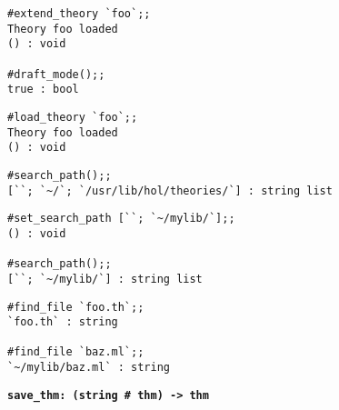 \vskip4mm
\begin{session}\begin{verbatim}
#extend_theory `foo`;;
Theory foo loaded
() : void

#draft_mode();;
true : bool
\end{verbatim}\end{session}

\vskip4mm
\begin{session}\begin{verbatim}
#load_theory `foo`;;
Theory foo loaded
() : void
\end{verbatim}\end{session}




\vskip4mm
\begin{session}\begin{verbatim}
#search_path();;
[``; `~/`; `/usr/lib/hol/theories/`] : string list
\end{verbatim}\end{session}


\vskip4mm
\begin{session}\begin{verbatim}
#set_search_path [``; `~/mylib/`];;
() : void

#search_path();;
[``; `~/mylib/`] : string list
\end{verbatim}\end{session}


\vskip4mm
\begin{session}\begin{verbatim}
#find_file `foo.th`;;
`foo.th` : string

#find_file `baz.ml`;;
`~/mylib/baz.ml` : string
\end{verbatim}\end{session}


\vskip5mm
\bspindent\LARGE\bf
\verb!save_thm: (string # thm) -> thm!
\espindent
\vskip 7mm

